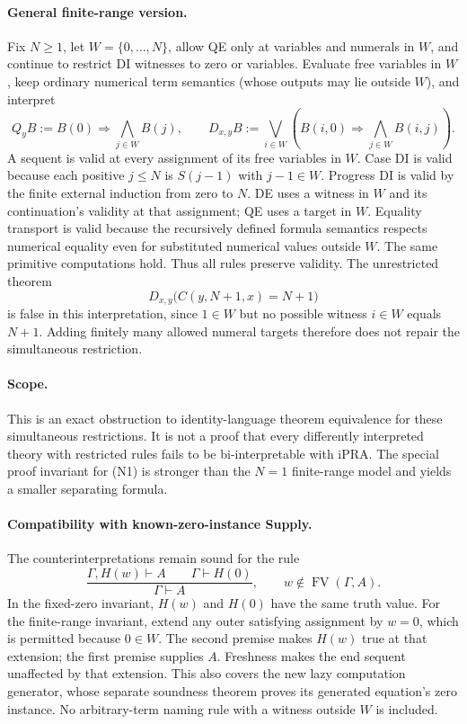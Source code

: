 \documentclass[11pt,letterpaper]{article}
\theoremstyle{definition}\newtheorem{definition}[theorem]{Definition}
\theoremstyle{remark}\newtheorem{remark}[theorem]{Remark}
\begin{document}
\paragraph{General finite-range version.}
Fix $N\geq1$, let $W=\{0,\ldots,N\}$, allow QE only at variables and
numerals in $W$, and continue to restrict DI witnesses to zero or
variables. Evaluate free variables in $W$, keep ordinary numerical term
semantics (whose outputs may lie outside $W$), and interpret
\[
Q_yB := B(0)\Rightarrow\bigwedge_{j\in W} B(j),\qquad
D_{x,y}B := \bigvee_{i\in W}\left(B(i,0)\Rightarrow
                              \bigwedge_{j\in W}B(i,j)\right).
\]
A sequent is valid at every assignment of its free variables in $W$.
Case DI is valid because each positive $j\leq N$ is $S(j-1)$ with
$j-1\in W$. Progress DI is valid by the finite external induction from
zero to $N$. DE uses a witness in $W$ and its continuation's validity at
that assignment; QE uses a target in $W$. Equality transport is valid
because the recursively defined formula semantics respects numerical
equality even for substituted numerical values outside $W$.
The same primitive computations hold. Thus all rules preserve validity.
The unrestricted theorem
\[
D_{x,y}\bigl(C(y,N+1,x)=N+1\bigr)
\]
is false in this interpretation, since $1\in W$ but no possible witness
$i\in W$ equals $N+1$. Adding finitely many allowed numeral targets
therefore does not repair the simultaneous restriction.

\paragraph{Scope.}
This is an exact obstruction to identity-language theorem equivalence for
these simultaneous restrictions. It is not a proof that every differently
interpreted theory with restricted rules fails to be bi-interpretable with
iPRA. The special proof invariant for (N1) is stronger than the $N=1$
finite-range model and yields a smaller separating formula.

\paragraph{Compatibility with known-zero-instance Supply.}
The counterinterpretations remain sound for the rule
\[
\frac{\Gamma,H(w)\vdash A\qquad\Gamma\vdash H(0)}
     {\Gamma\vdash A},\qquad w\notin\operatorname{FV}(\Gamma,A).
\]
In the fixed-zero invariant, $H(w)$ and $H(0)$ have the same truth value.
For the finite-range invariant, extend any outer satisfying assignment
by $w=0$, which is permitted because $0\in W$. The second premise makes
$H(w)$ true at that extension; the first premise supplies $A$. Freshness
makes the end sequent unaffected by that extension. This also covers the
new lazy computation generator, whose separate soundness theorem proves
its generated equation's zero instance. No arbitrary-term naming rule
with a witness outside $W$ is included.
\end{document}
